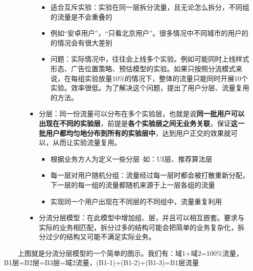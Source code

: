\documentclass[
  letterpaper,
  DIV=11,
  numbers=noendperiod]{scrreprt}
\begin{document}
\begin{itemize}
\begin{itemize}
\begin{itemize}
      \begin{itemize}
      \item
        适合互斥实验：实验在同一层拆分流量，且无论怎么拆分，不同组的流量是不会重叠的
      \item
        例如``安卓用户''，``只看北京用户''。很多情况中不同城市的用户的的情况会有很大差别
      \item
        问题：实际情况中，往往会上线多个实验。例如可能同时上线样式形态、广告位置策略、预估模型的实验。如果只按照分流模式来说，在每组实验放量10\%的情况下，整体的流量只能同时开展10个实验。效率很低。为了解决这个问题，提出了用户分层、流量复用的方法。
      \end{itemize}
    \item
      分层：同一份流量可以分布在多个实验层，也就是说\textbf{同一批用户可以出现在不同的实验层}，前提是\textbf{各个实验层之间无业务关联}，保证\textbf{这一批用户都均匀地分布到所有的实验层中}，达到用户正交的效果就可以，从而让实验流量复用。

      \begin{itemize}
      \item
        根据业务方人为定义一些分层--如：UI层、推荐算法层
      \item
        每一层对用户随机分组：流量经过每一层时都会被打散重新分配，下一层的每一组的流量都随机来源于上一层各组的流量
      \item
        实现同一个用户出现在不同层的不同组中，流量重复利用
      \end{itemize}
    \item
      分流分层模型：在此模型中增加组、层，并且可以相互嵌套。要求与实际的业务相匹配，拆分过多的结构可能会把简单的业务复杂化，拆分过少的结构又可能不满足实际业务。
    \end{itemize}
  \end{itemize}
\end{itemize}

  上图就是分流分层模型的一个简单的图示。我们有：域1+域2=100\%流量，B1层=B2层=B3层=域2流量，(B1-1)+(B1-2)+(B1-3)=B1层流量
\end{document}

